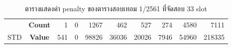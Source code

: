 \begin{table}[]
{\begin{tabular}{@{}ccrrrrrrrr@{}}
    {\color[HTML]{FE0000} }                      & {\color[HTML]{FE0000} \textbf{Count}} & {\color[HTML]{FE0000} 1}       & {\color[HTML]{FE0000} 0}       & {\color[HTML]{FE0000} 1267}    & {\color[HTML]{FE0000} 462}     & {\color[HTML]{FE0000} 527}     & {\color[HTML]{FE0000} 274}     & {\color[HTML]{FE0000} 4580}    & {\color[HTML]{FE0000} 7111}      \\ \cmidrule(l){2-10} 
    \multirow{-2}{*}{{\color[HTML]{FE0000} STD}} & {\color[HTML]{FE0000} \textbf{Value}} & {\color[HTML]{FE0000} 541}     & {\color[HTML]{FE0000} 0}       & {\color[HTML]{FE0000} 98826}   & {\color[HTML]{FE0000} 36036}   & {\color[HTML]{FE0000} 20026}   & {\color[HTML]{FE0000} 7946}    & {\color[HTML]{FE0000} 54960}   & {\color[HTML]{FE0000} 218335}    \\ \bottomrule
    \end{tabular}%
    }
    \caption{ตารางแสดงค่า penalty ของตารางสอบเทอม 1/2561 ที่จัดสอบ 33 slot}
    \label{tab:result_table_161_33}
\end{table}
